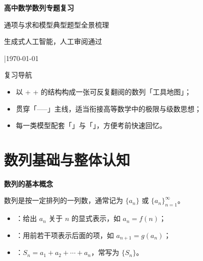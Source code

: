 \documentclass[a4paper,11pt]{ctexart}
\renewcommand{\notetitle}{高中数学数列专题复习}
\renewcommand{\noteauthor}{生成式人工智能，人工审阅通过}
\renewcommand{\notedate}{\today}
\renewcommand{\notesubtitle}{通项与求和模型\quad 典型题型全景梳理}
\newcommand{\SeqMiniHeading}[1]{%
  \par\smallskip
  \noindent\textbf{#1}\par\smallskip
}
\begin{document}
\thispagestyle{empty}
\setcounter{page}{1}

\noindent
\begin{minipage}[t][0.7\textheight][c]{\textwidth}
  \raggedleft
  \vspace*{\fill}
  {\sffamily\bfseries\Huge\color{accent}\notetitle\par}
  \vspace{0.6em}
  {\Large\color{inkgray}\notesubtitle\par}
  \vspace{0.5em}
  {\large\color{inkgray}\noteauthor\par}
  \vspace{0.4em}
  {\normalsize\color{inkgray}\noteversion\quad|\quad\notedate\par}
  \vspace*{\fill}
\end{minipage}

\begin{center}
\begin{minipage}{0.84\textwidth}
  \textcolor{inkgray}{\sffamily\small 复习导航}\\
  \begin{itemize}
    \item 以  +  +  的结构构成一张可反复翻阅的数列「工具地图」；
    \item 贯穿「–––」主线，适当衔接高等数学中的极限与级数思想；
    \item 每一类模型配套「」与「」，方便考前快速回忆。
  \end{itemize}
\end{minipage}
\end{center}
\vspace{1em}

\clearpage
\thispagestyle{plain}
\tableofcontents

\clearpage
\fi
\section{数列基础与整体认知}

\SeqMiniHeading{数列的基本概念}
数列是按一定排列的一列数，通常记为 $\{a_n\}$ 或 $\{a_n\}_{n=1}^{\infty}$。
\begin{itemize}
  \item {}：给出 $a_n$ 关于 $n$ 的显式表示，如 $a_n=f(n)$；
  \item {}：用前若干项表示后面的项，如 $a_{n+1}=g(a_n)$；
  \item {}：$S_n = a_1 + a_2 + \cdots + a_n$，常写为 $\{S_n\}$。
\end{itemize}
\end{document}
